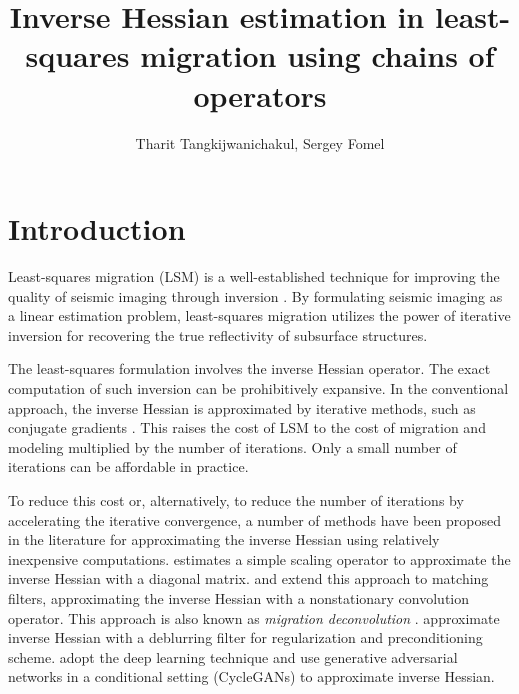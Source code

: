 \newcommand{\rs}[1]{\mathstrut\mbox{\scriptsize\rm #1}}
\newcommand{\rr}[1]{\mbox{\rm #1}}
\newcommand\inv[1]{#1\raisebox{1.15ex}{$\scriptscriptstyle-\!1$}} %

\title{Inverse Hessian estimation in least-squares migration using chains of operators}
\renewcommand{\thefootnote}{\fnsymbol{footnote}}
\author{Tharit Tangkijwanichakul, Sergey Fomel}


\maketitle

\section{Introduction}
Least-squares migration (LSM) is a well-established technique for improving the quality of seismic imaging through inversion \cite[]{nemeth,ronen}. By formulating seismic imaging as a linear estimation problem, least-squares migration utilizes the power of iterative inversion for recovering the true reflectivity of subsurface structures.

The least-squares formulation involves the inverse Hessian operator. The exact computation of such inversion can be prohibitively expansive. In the conventional approach, the inverse Hessian is approximated by iterative methods, such as conjugate gradients \cite[]{tarantola,sun,xue}. This raises the cost of LSM to the cost of migration and modeling multiplied by the number of iterations. Only a small number of iterations can be affordable in practice. 

To reduce this cost or, alternatively, to reduce the number of iterations by accelerating the iterative convergence, a number of methods have been proposed in the literature for approximating the inverse Hessian using relatively inexpensive computations. \cite{rickett} estimates a simple scaling operator to approximate the inverse Hessian with a diagonal matrix. \cite{guitton} and \cite{greer} extend this approach to matching filters, approximating the inverse Hessian with a nonstationary convolution operator. This approach is also known as \emph{migration deconvolution} \cite[]{hu2001,yu2006}. \cite{aoki} approximate inverse Hessian with a deblurring filter for regularization and preconditioning scheme. \cite{kaur} adopt the deep learning technique and use generative adversarial networks in a conditional setting (CycleGANs) to approximate inverse Hessian.

